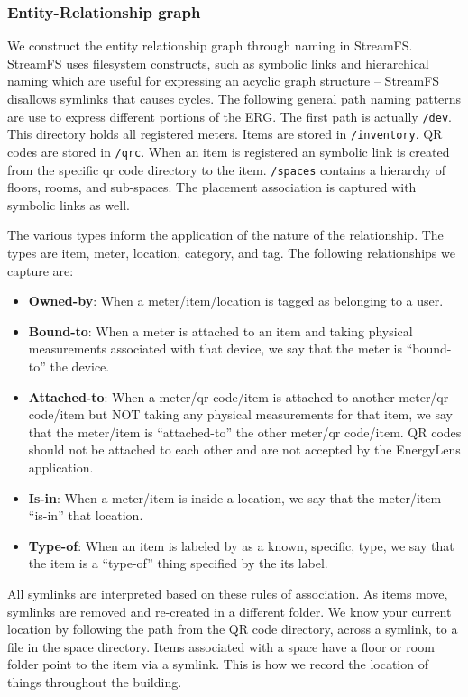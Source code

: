 \subsubsection{Entity-Relationship graph}
We construct the entity relationship graph through naming in StreamFS.  StreamFS uses filesystem constructs, such as symbolic
links and hierarchical naming which are useful for expressing an acyclic graph structure -- StreamFS disallows symlinks that causes cycles.  
The following general path naming patterns are use to express different portions of the ERG.
The first path is actually {\tt /dev}.  This directory
holds all registered meters.  Items are stored in {\tt /inventory}.  QR codes are stored in {\tt /qrc}.  When an item is registered an 
symbolic link is created from the specific qr code directory to the item.  {\tt /spaces} contains a hierarchy of floors, rooms, 
and sub-spaces.  The placement association is captured with symbolic links as well.

The various types inform the application of the nature of the relationship.  The types are item, meter, 
location, category, and tag.  The following relationships we capture are:

\begin{itemize}
\item {\bf Owned-by}: When a meter/item/location is tagged as belonging to a user.
\item {\bf Bound-to}: When a meter is attached to an item and taking physical measurements associated with that 
		device, we say that the meter is ``bound-to'' the device.
\item {\bf Attached-to}: When a meter/qr code/item is attached to another meter/qr code/item but NOT taking any 
		physical measurements for that item, we say that the meter/item is ``attached-to'' the other meter/qr 
		code/item.  QR codes should not be attached to each other and are not accepted by the EnergyLens application.
\item {\bf Is-in}: When a meter/item is inside a location, we say that the meter/item ``is-in'' that location.
\item {\bf Type-of}: When an item is labeled by as a known, specific, type, we say that the item is a ``type-of'' thing 
		specified by the its label.
\end{itemize}

All symlinks are interpreted based on these rules of association.  As items move, symlinks are removed and re-created
in a different folder.  We know your current location by following the path from the QR code directory, across a symlink, 
to a file in the space directory.  Items associated with a space have a floor or room folder point to the item
via a symlink.  This is how we record the location of things throughout the building.


